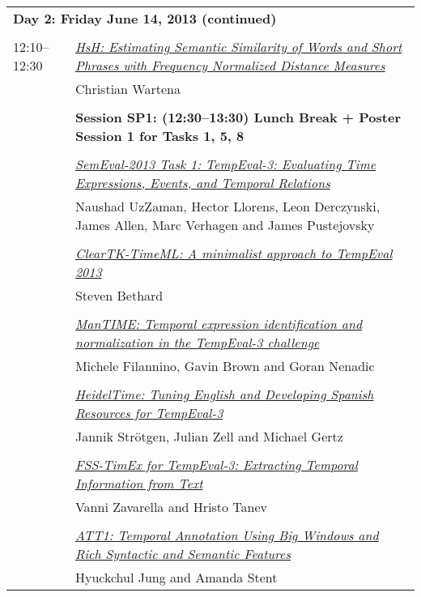 \begin{tabular}{p{20mm}p{138mm}}
\\
\multicolumn{2}{l}{\bf Day 2: Friday June 14, 2013 (continued)} \\\\
12:10--12:30 & \hyperlink{page.48}{\em HsH: Estimating Semantic Similarity of Words and Short Phrases with Frequency Normalized Distance Measures}\\
         & Christian Wartena \\
\\

 & {\bf Session SP1: (12:30--13:30) Lunch Break + Poster Session 1 for Tasks 1, 5, 8} \\
\\

& \hyperlink{page.1}{\em SemEval-2013 Task 1: TempEval-3: Evaluating Time Expressions, Events, and Temporal Relations}\\
         & Naushad UzZaman, Hector Llorens, Leon Derczynski, James Allen, Marc Verhagen and James Pustejovsky \\
\\

& \hyperlink{page.10}{\em ClearTK-TimeML: A minimalist approach to TempEval 2013}\\
         & Steven Bethard \\
\\

 
& \hyperlink{page.53}{\em ManTIME: Temporal expression identification and normalization in the TempEval-3 challenge}\\
         & Michele Filannino, Gavin Brown and Goran Nenadic \\
\\

& \hyperlink{page.15}{\em HeidelTime: Tuning English and Developing Spanish  Resources for TempEval-3}\\
         & Jannik Str\"{o}tgen, Julian Zell and Michael Gertz \\
\\

 & \hyperlink{page.58}{\em FSS-TimEx for TempEval-3: Extracting Temporal Information from Text}\\
         & Vanni Zavarella and Hristo Tanev \\
\\

 & \hyperlink{page.20}{\em ATT1: Temporal Annotation Using Big Windows and Rich Syntactic and Semantic Features}\\
         & Hyuckchul Jung and Amanda Stent \\


\end{tabular}
